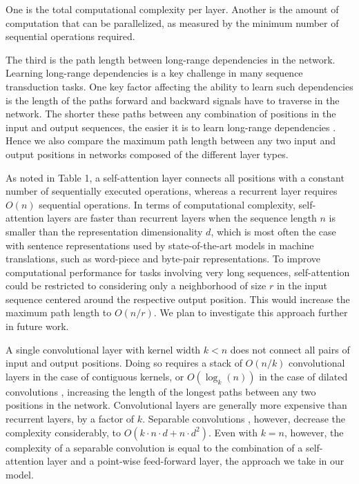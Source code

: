 \documentclass[12pt, a4paper]{article}
\begin{document}
One is the total computational complexity per layer. Another is the amount of computation that can be parallelized, as measured by the minimum number of sequential operations required.

The third is the path length between long-range dependencies in the network. Learning long-range dependencies is a key challenge in many sequence transduction tasks. One key factor affecting the ability to learn such dependencies is the length of the paths forward and backward signals have to traverse in the network. The shorter these paths between any combination of positions in the input and output sequences, the easier it is to learn long-range dependencies \cite{ref12}. Hence we also compare the maximum path length between any two input and output positions in networks composed of the different layer types.

As noted in Table 1, a self-attention layer connects all positions with a constant number of sequentially executed operations, whereas a recurrent layer requires $O(n)$ sequential operations. In terms of computational complexity, self-attention layers are faster than recurrent layers when the sequence length $n$ is smaller than the representation dimensionality $d$, which is most often the case with sentence representations used by state-of-the-art models in machine translations, such as word-piece \cite{ref38} and byte-pair \cite{ref31} representations. To improve computational performance for tasks involving very long sequences, self-attention could be restricted to considering only a neighborhood of size $r$ in the input sequence centered around the respective output position. This would increase the maximum path length to $O(n/r)$. We plan to investigate this approach further in future work.

A single convolutional layer with kernel width $k < n$ does not connect all pairs of input and output positions. Doing so requires a stack of $O(n/k)$ convolutional layers in the case of contiguous kernels, or $O(\log_k(n))$ in the case of dilated convolutions \cite{ref18}, increasing the length of the longest paths between any two positions in the network. Convolutional layers are generally more expensive than recurrent layers, by a factor of $k$. Separable convolutions \cite{ref6}, however, decrease the complexity considerably, to $O(k \cdot n \cdot d + n \cdot d^2)$. Even with $k = n$, however, the complexity of a separable convolution is equal to the combination of a self-attention layer and a point-wise feed-forward layer, the approach we take in our model.
\end{document}
